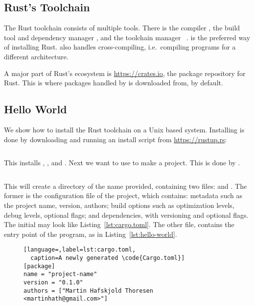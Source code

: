 \documentclass[b5paper]{report}
\begin{document}
\begin{appendices} \chapter{Rust's Toolchain\label{ch:rust-toolchain}} The Rust
  toolchain consists of multiple tools. There is the compiler \rustc{}, the
  build tool and dependency manager \cargo{}, and the toolchain manager
  \rustup~\cite{rustup}. \rustup{} is the preferred way of installing Rust.
  \rustup{} also handles cross-compiling, i.e.\ compiling programs for a
  different architecture.

  A major part of Rust's ecosystem is \url{https://crates.io}, the package repository
  for Rust. This is where packages handled by \cargo{} is downloaded from, by default.

  \section{Hello World}
  We show how to install the Rust toolchain on a Unix based system.
  Installing \rustup{} is done by downloading and running an install script from
  \url{https://rustup.rs}:
  \begin{lstlisting}[language=Bash,numbers=none]
% curl https://sh.rustup.rs -sSf | sh
  \end{lstlisting}
  This installs \rustup{}, \cargo{}, and \rustc{}.
  Next we want to use \cargo{} to make a project. This is done by .
  \begin{lstlisting}[language=Bash,numbers=none]
% cargo init --bin <name-of-project>
  \end{lstlisting}
  This will create a directory of the name provided, containing two files:
   and .
  The former is the configuration file of the project, which contains:
  metadata such as the project name, version, authors;
  build options such as optimization levels, debug levels, optional flags;
  and dependencies, with versioning and optional flags.
  The initial  may look like Listing~\ref{lst:cargo.toml}.
  The other file,  contains the entry point of the program, as
  in Listing~\ref{lst:hello-world}.
  \clearpage{}

  \begin{figure}[ht]
  \begin{lstlisting}[language=,label=lst:cargo.toml,
  caption=A newly generated \code{Cargo.toml}]
[package]
name = "project-name"
version = "0.1.0"
authors = ["Martin Hafskjold Thoresen <martinhath@gmail.com>"]


\end{lstlisting}
\end{figure}
\end{appendices}
\end{document}
